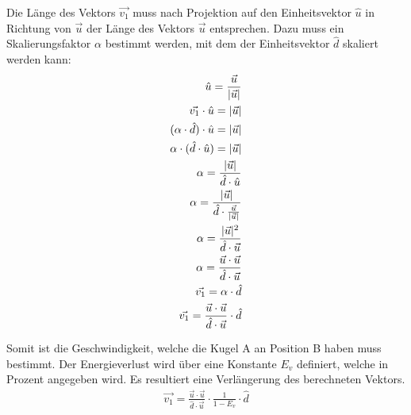 Die Länge des Vektors $\vec{v_1}$ muss nach Projektion auf den Einheitsvektor $\hat{u}$ in Richtung
von $\vec{u}$ der Länge des Vektors $\vec{u}$ entsprechen. Dazu muss ein Skalierungsfaktor $\alpha$ bestimmt werden,
mit dem der Einheitsvektor $\hat{d}$ skaliert werden kann:
\begin{align}
    \hat{u} = \frac{\vec{u}}{\lvert \vec{u} \rvert}\\
    \vec{v_1} \cdot \hat{u} = \lvert \vec{u} \rvert\\
    (\alpha \cdot \hat{d}) \cdot \hat{u} = \lvert \vec{u} \rvert\\
    \alpha \cdot (\hat{d} \cdot \hat{u}) = \lvert \vec{u} \rvert\\
    \alpha = \frac{\lvert \vec{u} \rvert}{\hat{d} \cdot \hat{u}}\\
    \alpha = \frac{\lvert \vec{u} \rvert}{\hat{d} \cdot \frac{\vec{u}}{\lvert \vec{u} \rvert}}\\
    \alpha = \frac{\lvert \vec{u} \rvert^2}{\hat{d} \cdot \vec{u}}\\
    \alpha = \frac{\vec{u} \cdot \vec{u}}{\hat{d} \cdot \vec{u}}\\
    \vec{v_1} = \alpha \cdot \hat{d}\\
    \vec{v_1} = \frac{\vec{u} \cdot \vec{u}}{\hat{d} \cdot \vec{u}} \cdot \hat{d}
\end{align}

Somit ist die Geschwindigkeit, welche die Kugel A an Position B haben muss bestimmt.
Der Energieverlust wird über eine Konstante $E_v$ definiert, welche in Prozent angegeben wird.
Es resultiert eine Verlängerung des berechneten Vektors.
\begin{align}
    \vec{v_1} = \frac{\vec{u} \cdot \vec{u}}{\hat{d} \cdot \vec{u}} \cdot \frac{1}{1 - E_v} \cdot \hat{d}
\end{align}